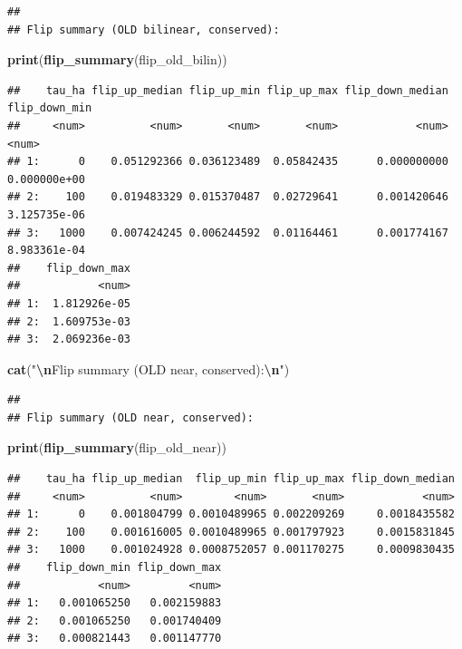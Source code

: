 \documentclass[
  11pt,
]{article}
\newenvironment{Shaded}{\begin{snugshade}}{\end{snugshade}}
\newcommand{\FunctionTok}[1]{\textcolor[rgb]{0.13,0.29,0.53}{\textbf{#1}}}
\newcommand{\NormalTok}[1]{#1}
\newcommand{\SpecialCharTok}[1]{\textcolor[rgb]{0.81,0.36,0.00}{\textbf{#1}}}
\newcommand{\StringTok}[1]{\textcolor[rgb]{0.31,0.60,0.02}{#1}}
\begin{document}
\begin{verbatim}
## 
## Flip summary (OLD bilinear, conserved):
\end{verbatim}

\begin{Shaded}
\begin{Highlighting}[]
\FunctionTok{print}\NormalTok{(}\FunctionTok{flip\_summary}\NormalTok{(flip\_old\_bilin))}
\end{Highlighting}
\end{Shaded}

\begin{verbatim}
##    tau_ha flip_up_median flip_up_min flip_up_max flip_down_median flip_down_min
##     <num>          <num>       <num>       <num>            <num>         <num>
## 1:      0    0.051292366 0.036123489  0.05842435      0.000000000  0.000000e+00
## 2:    100    0.019483329 0.015370487  0.02729641      0.001420646  3.125735e-06
## 3:   1000    0.007424245 0.006244592  0.01164461      0.001774167  8.983361e-04
##    flip_down_max
##            <num>
## 1:  1.812926e-05
## 2:  1.609753e-03
## 3:  2.069236e-03
\end{verbatim}

\begin{Shaded}
\begin{Highlighting}[]
\FunctionTok{cat}\NormalTok{(}\StringTok{"}\SpecialCharTok{\textbackslash{}n}\StringTok{Flip summary (OLD near, conserved):}\SpecialCharTok{\textbackslash{}n}\StringTok{"}\NormalTok{)}
\end{Highlighting}
\end{Shaded}

\begin{verbatim}
## 
## Flip summary (OLD near, conserved):
\end{verbatim}

\begin{Shaded}
\begin{Highlighting}[]
\FunctionTok{print}\NormalTok{(}\FunctionTok{flip\_summary}\NormalTok{(flip\_old\_near))}
\end{Highlighting}
\end{Shaded}

\begin{verbatim}
##    tau_ha flip_up_median  flip_up_min flip_up_max flip_down_median
##     <num>          <num>        <num>       <num>            <num>
## 1:      0    0.001804799 0.0010489965 0.002209269     0.0018435582
## 2:    100    0.001616005 0.0010489965 0.001797923     0.0015831845
## 3:   1000    0.001024928 0.0008752057 0.001170275     0.0009830435
##    flip_down_min flip_down_max
##            <num>         <num>
## 1:   0.001065250   0.002159883
## 2:   0.001065250   0.001740409
## 3:   0.000821443   0.001147770
\end{verbatim}
\end{document}
